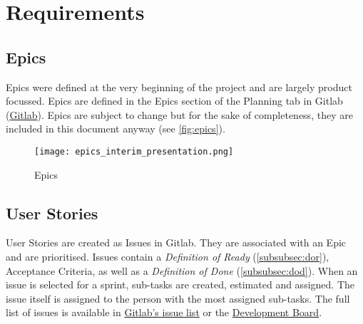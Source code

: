 \section{Requirements}\label{sec:requirements}
\subsection{Epics}\label{subsec:epics}
Epics were defined at the very beginning of the project and are largely product focussed.
Epics are defined in the Epics section of the Planning tab in Gitlab (\href{https://gitlab.ti.bfh.ch/groups/decibel-threshold-event-displayer/-/epics}{Gitlab}). Epics are subject to change
but for the sake of completeness, they are included in this document anyway (see \autoref{fig:epics}).
\begin{figure}[H]
    \centering
    \texttt{[image: epics\_interim\_presentation.png]}
    \caption{Epics}\label{fig:epics}
\end{figure}
\subsection{User Stories}\label{subsec:user-stories}
User Stories are created as Issues in Gitlab.
They are associated with an Epic and are prioritised.
Issues contain a \textit{Definition of Ready} (\ref{subsubsec:dor}), Acceptance Criteria, as well as a \textit{Definition of Done} (\ref{subsubsec:dod}).
When an issue is selected for a sprint, sub-tasks are created, estimated and assigned.
The issue itself is assigned to the person with the most assigned sub-tasks.
The full list of issues is available in \href{https://gitlab.ti.bfh.ch/groups/decibel-threshold-event-displayer/-/issues}{Gitlab's issue list} or the \href{https://gitlab.ti.bfh.ch/decibel-threshold-event-displayer/decibel-threshold-event-displayer/-/boards/2832}{Development Board}.

